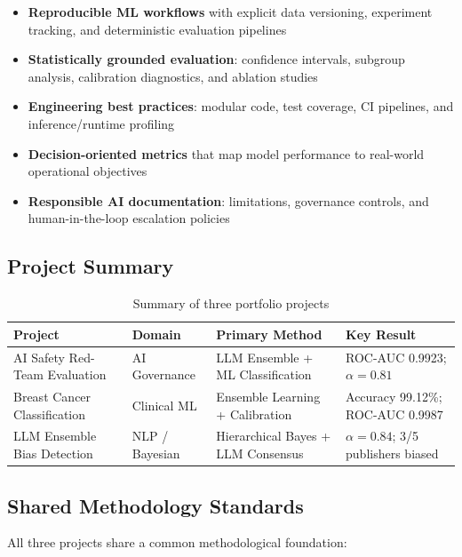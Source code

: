 \documentclass[11pt,a4paper]{article}
\begin{document}
\begin{itemize}[leftmargin=*]
    \item \textbf{Reproducible ML workflows} with explicit data versioning, experiment tracking, and deterministic evaluation pipelines
    \item \textbf{Statistically grounded evaluation}: confidence intervals, subgroup analysis, calibration diagnostics, and ablation studies
    \item \textbf{Engineering best practices}: modular code, test coverage, CI pipelines, and inference/runtime profiling
    \item \textbf{Decision-oriented metrics} that map model performance to real-world operational objectives
    \item \textbf{Responsible AI documentation}: limitations, governance controls, and human-in-the-loop escalation policies
\end{itemize}

\subsection{Project Summary}

\begin{table}[H]
\centering
\caption{Summary of three portfolio projects}
\begin{tabular}{llll}
\toprule
\textbf{Project} & \textbf{Domain} & \textbf{Primary Method} & \textbf{Key Result} \\
\midrule
AI Safety Red-Team Evaluation & AI Governance & LLM Ensemble + ML Classification & ROC-AUC 0.9923; $\alpha = 0.81$ \\
Breast Cancer Classification & Clinical ML & Ensemble Learning + Calibration & Accuracy 99.12\%; ROC-AUC 0.9987 \\
LLM Ensemble Bias Detection & NLP / Bayesian & Hierarchical Bayes + LLM Consensus & $\alpha = 0.84$; 3/5 publishers biased \\
\bottomrule
\end{tabular}
\label{tab:portfolio_summary}
\end{table}

\subsection{Shared Methodology Standards}

All three projects share a common methodological foundation:
\end{document}
